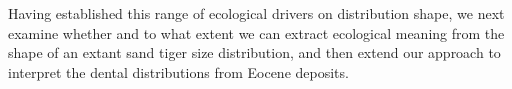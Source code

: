 \documentclass[]{rsos}%
\begin{document}
Having established this range of ecological drivers on distribution shape, we next examine whether and to what extent we can extract ecological meaning from the shape of an extant sand tiger size distribution, and then extend our approach to interpret the dental distributions from Eocene deposits.








\end{document}
